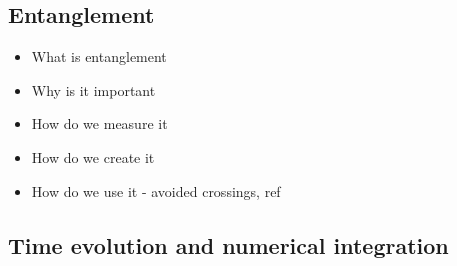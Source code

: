 \documentclass{subfiles}
\begin{document}
\subsection{Entanglement}
\begin{itemize}
    \item What is entanglement
    \item Why is it important
    \item How do we measure it
    \item How do we create it
    \item How do we use it - avoided crossings, ref \cite{nazir2005anticrossings}
\end{itemize}


\subsection{Time evolution and numerical integration}
\end{document}
